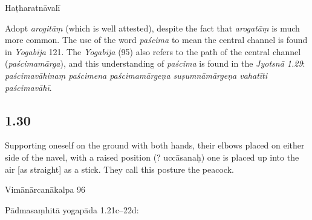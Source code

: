 \begin{ekdosis}
\begin{testimonia}[hp01_029]
Haṭharatnāvalī

\begin{versinnote}
\end{versinnote}

\end{testimonia}

\begin{philcomm}[hp01_029]
Adopt \emph{arogitāṃ} (which is well attested), despite the fact that \emph{arogatāṃ} is much more common. The use of the word \emph{paścima} to mean the central channel is found in \emph{Yogabīja} 121. The  \emph{Yogabīja} (95) also refers to the path of the central channel (\emph{paścimamārga}), and this understanding of \emph{paścima} is found in the \emph{Jyotsnā 1.29}: \emph{paścimavāhinaṃ paścimena paścimamārgeṇa suṣumnāmārgeṇa vahatīti paścimavāhī}.
\end{philcomm}

\subsection*{1.30}
\begin{translation}[hp01_030]
Supporting oneself on the ground with both hands, their elbows placed on either side of the navel, with a raised position (? uccāsanaḥ) one is placed up into the air [as straight] as a stick. They call this posture the peacock.
\end{translation}

\begin{sources}[hp01_030]
Vimānārcanākalpa 96

\begin{versinnote}
\end{versinnote}

Pādmasaṃhitā yogapāda 1.21c–22d:

\begin{versinnote}
\end{versinnote}


\end{sources}
\end{ekdosis}
